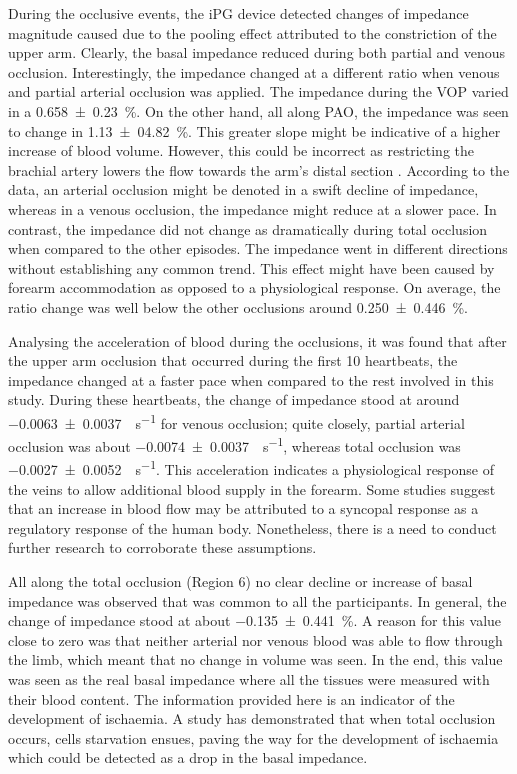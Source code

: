 During the occlusive events, the iPG device detected changes of impedance magnitude caused due to the pooling effect attributed to the constriction of the upper arm. Clearly, the basal impedance reduced during both partial and venous occlusion. Interestingly, the impedance changed at a different ratio when venous and partial arterial occlusion was applied. The impedance during the VOP varied in a \SI{0.658(0230)}{\percent}. On the other hand, all along PAO, the impedance was seen to change in \SI{1.13(0482)}{\percent}. This greater slope might be indicative of a higher increase of blood volume. However, this could be incorrect as restricting the brachial artery lowers the flow towards the arm's distal section \cite{mccully2004muscle}. According to the data, an arterial occlusion might be denoted in a swift decline of impedance, whereas in a venous occlusion, the impedance might reduce at a slower pace. In contrast, the impedance did not change as dramatically during total occlusion when compared to the other episodes. The impedance went in different directions without establishing any common trend. This effect might have been caused by forearm accommodation as opposed to a physiological response. On average, the ratio change was well below the other occlusions around \SI{0.250(0446)}{\percent}. 

Analysing the acceleration of blood during the occlusions, it was found that after the upper arm occlusion that occurred during the first 10 heartbeats, the impedance changed at a faster pace when compared to the rest involved in this study. During these heartbeats, the change of impedance stood at around \SI{-0.0063(00037)}{\Omega \per \second} for venous occlusion; quite closely, partial arterial occlusion was about \SI{-0.0074(00037)}{\Omega \per \second}, whereas total occlusion was \SI{-0.0027(00052)}{\Omega \per \second}. This acceleration indicates a physiological response of the veins to allow additional blood supply in the forearm. Some studies \cite{joyner2001belfast, hainsworth2003syncope} suggest that an increase in blood flow may be attributed to a syncopal response as a regulatory response of the human body. Nonetheless, there is a need to conduct further research to corroborate these assumptions. 

All along the total occlusion (Region 6) no clear decline or increase of basal impedance was observed that was common to all the participants. In general, the change of impedance stood at about \SI{-0.135(0441)}{\percent}. A reason for this value close to zero was that neither arterial nor venous blood was able to flow through the limb, which meant that no change in volume was seen. In the end, this value was seen as the real basal impedance where all the tissues were measured with their blood content. The information provided here is an indicator of the development of ischaemia. A study has demonstrated that when total occlusion occurs, cells starvation ensues, paving the way for the development of ischaemia \cite{ristic1997muscle} which could be detected as a drop in the basal impedance.


